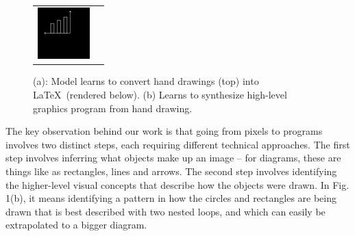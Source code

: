 \documentclass{article}
\newcommand{\exampleImageSize}{2cm}
\theoremstyle{definition}
\begin{document}
\begin{figure}[H]
\begin{minipage}[b]{0.35\linewidth}
\begin{tabular}{ll}
    \includegraphics[width = \exampleImageSize]{figures/58.png}
\end{tabular}
\subcaption{}
  \end{minipage}
  \begin{minipage}[b]{0.6\linewidth}\centering
    \subcaption{}
  \end{minipage}
  \caption{(a): Model learns to convert hand drawings (top) into \LaTeX~(rendered below). (b) Learns to synthesize high-level graphics program from hand drawing.}\label{firstPageExamples}
\end{figure}
 
 The key observation behind our work is that going from pixels to programs involves two distinct steps, each requiring different technical approaches. The first step involves inferring what objects make up an image -- for diagrams, these are things like as rectangles, lines and arrows. The second step involves identifying the higher-level visual concepts that describe how the objects were drawn. In Fig. 1(b), it means identifying a pattern in how the circles and rectangles are being drawn that is best described with two nested loops, and which can easily be extrapolated to a bigger diagram.
\end{document}
